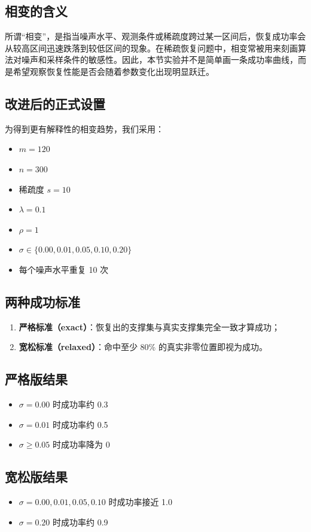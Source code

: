 \documentclass[12pt,a4paper]{ctexart}
\begin{document}
\subsection{相变的含义}
所谓“相变”，是指当噪声水平、观测条件或稀疏度跨过某一区间后，恢复成功率会从较高区间迅速跌落到较低区间的现象。在稀疏恢复问题中，相变常被用来刻画算法对噪声和采样条件的敏感性。因此，本节实验并不是简单画一条成功率曲线，而是希望观察恢复性能是否会随着参数变化出现明显跃迁。

\subsection{改进后的正式设置}
为得到更有解释性的相变趋势，我们采用：
\begin{itemize}[leftmargin=2em]
    \item $m=120$
    \item $n=300$
    \item 稀疏度 $s=10$
    \item $\lambda=0.1$
    \item $\rho=1$
    \item $\sigma \in \{0.00, 0.01, 0.05, 0.10, 0.20\}$
    \item 每个噪声水平重复 10 次
\end{itemize}

\subsection{两种成功标准}
\begin{enumerate}[label=\arabic*.]
    \item \textbf{严格标准（exact）}：恢复出的支撑集与真实支撑集完全一致才算成功；
    \item \textbf{宽松标准（relaxed）}：命中至少 80\% 的真实非零位置即视为成功。
\end{enumerate}

\subsection{严格版结果}
\begin{itemize}[leftmargin=2em]
    \item $\sigma=0.00$ 时成功率约 0.3
    \item $\sigma=0.01$ 时成功率约 0.5
    \item $\sigma \ge 0.05$ 时成功率降为 0
\end{itemize}

\subsection{宽松版结果}
\begin{itemize}[leftmargin=2em]
    \item $\sigma=0.00, 0.01, 0.05, 0.10$ 时成功率接近 1.0
    \item $\sigma=0.20$ 时成功率约 0.9
\end{itemize}
\end{document}
